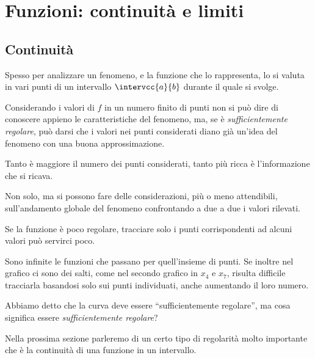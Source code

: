 


\chapter{Funzioni: continuità e limiti}

\section{Continuità}
\label{sec:cont_continuita}

Spesso per analizzare un fenomeno, e la funzione che lo rappresenta,  lo si 
valuta in vari punti di un intervallo \(\intervcc{a}{b}\) durante il 
quale si svolge.

{
Considerando i valori di \(f\) in un numero finito di punti non si può dire 
di conoscere appieno le caratteristiche del fenomeno, ma, se è 
\emph{sufficientemente regolare}, può darsi che i valori nei punti 
considerati diano già un'idea del fenomeno con una buona approssimazione.

Tanto è maggiore il numero dei punti considerati, tanto più ricca è 
l'informazione che si ricava. 

Non solo, ma si possono fare delle considerazioni, più o meno attendibili, 
sull'andamento globale del fenomeno confrontando a due a due i valori 
rilevati.
}
{\scalebox{1}{\partizionen}}

Se la funzione è poco regolare, tracciare solo i punti corrispondenti ad 
alcuni valori può servirci poco.

{\scalebox{1}{\puntigrafico}}
{\scalebox{1}{\graficodiscontinuo}}

Sono infinite le funzioni che passano per quell'insieme di punti. 
Se inoltre nel grafico ci sono dei salti, come nel secondo grafico
in \(x_4\) e \(x_7\), risulta difficile tracciarla 
basandosi solo sui punti individuati, anche aumentando il loro numero.

Abbiamo detto che la curva deve essere ``sufficientemente regolare'',
ma cosa significa essere \emph{sufficientemente regolare}?

Nella prossima sezione parleremo di un certo tipo di regolarità molto 
importante che è la continuità di una funzione in un intervallo.

